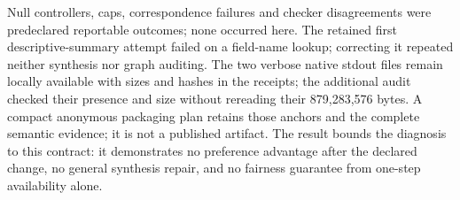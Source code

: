 Null controllers, caps, correspondence failures and checker disagreements
were predeclared reportable outcomes; none occurred here. The retained
first descriptive-summary attempt failed on a field-name lookup; correcting
it repeated neither synthesis nor graph auditing. The two verbose native
stdout files remain locally available with sizes and hashes in the receipts;
the additional audit checked their presence and size without rereading
their 879,283,576 bytes. A compact anonymous packaging plan retains those
anchors and the complete semantic evidence; it is not a published artifact.
The result bounds the diagnosis to this contract: it demonstrates no
preference advantage after the declared change, no general synthesis repair,
and no fairness guarantee from one-step availability alone.
